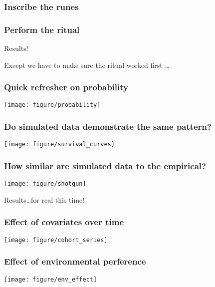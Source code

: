 \documentclass{beamer}
\begin{document}
\begin{frame}
  \frametitle{Inscribe the runes}
  \begin{tiny}
    
  \end{tiny}
\end{frame}


\begin{frame}
  \frametitle{Perform the ritual}
  \begin{tiny}
    
  \end{tiny}
\end{frame}

\begin{frame}
  \huge{Results!}
\end{frame}

\begin{frame}
  \huge{Except we have to make sure the ritual worked first \dots}
\end{frame}

\begin{frame}
  \frametitle{Quick refresher on probability}
  \texttt{[image: figure/probability]}
\end{frame}

\begin{frame}
  \frametitle{Do simulated data demonstrate the same pattern?}
  \texttt{[image: figure/survival\_curves]}
\end{frame}

\begin{frame}
  \frametitle{How similar are simulated data to the empirical?}
  \texttt{[image: figure/shotgun]}
\end{frame}

\begin{frame}
  \huge{Results\dots for real this time!}
\end{frame}

\begin{frame}
  \frametitle{Effect of covariates over time}
  \texttt{[image: figure/cohort\_series]}
\end{frame}

\begin{frame}
  \frametitle{Effect of environmental perference}
  \texttt{[image: figure/env\_effect]}
\end{frame}
\end{document}

